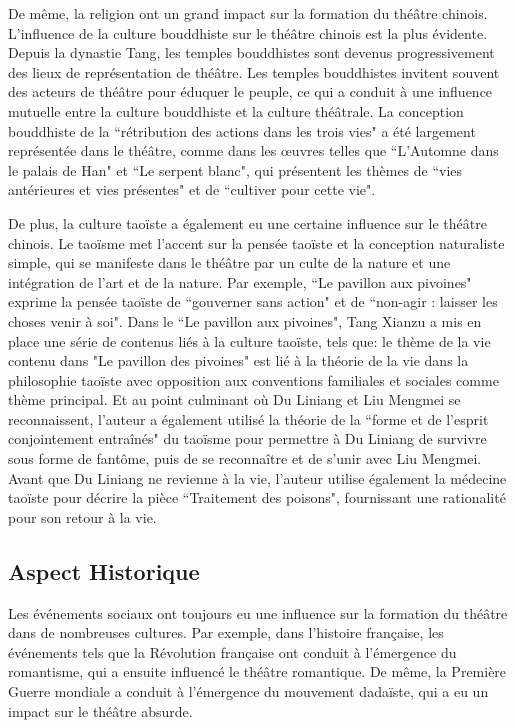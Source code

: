 \documentclass[UTF8,a4paper,12pt]{ctexart}
\numberwithin{equation}{section}
\newcommand{\mycite}[1]{\cite{#1}}
\begin{document}
De même, la religion ont un grand impact sur la formation du théâtre chinois. L'influence de la culture bouddhiste sur le théâtre chinois est la plus évidente. Depuis la dynastie Tang, les temples bouddhistes sont devenus progressivement des lieux de représentation de théâtre. Les temples bouddhistes invitent souvent des acteurs de théâtre pour éduquer le peuple, ce qui a conduit à une influence mutuelle entre la culture bouddhiste et la culture théâtrale\mycite{00}. La conception bouddhiste de la ``rétribution des actions dans les trois vies" a été largement représentée dans le théâtre, comme dans les œuvres telles que ``L'Automne dans le palais de Han" et ``Le serpent blanc", qui présentent les thèmes de ``vies antérieures et vies présentes" et de ``cultiver pour cette vie".

De plus, la culture taoïste a également eu une certaine influence sur le théâtre chinois. Le taoïsme met l'accent sur la pensée taoïste et la conception naturaliste simple, qui se manifeste dans le théâtre par un culte de la nature et une intégration de l'art et de la nature\mycite{55}. Par exemple, ``Le pavillon aux pivoines" exprime la pensée taoïste de ``gouverner sans action" et de ``non-agir : laisser les choses venir à soi". Dans le ``Le pavillon aux pivoines", Tang Xianzu a mis en place une série de contenus liés à la culture taoïste, tels que: le thème de la vie contenu dans "Le pavillon des pivoines" est lié à la théorie de la vie dans la philosophie taoïste avec opposition aux conventions familiales et sociales comme thème principal. Et au point culminant où Du Liniang et Liu Mengmei se reconnaissent, l'auteur a également utilisé la théorie de la ``forme et de l'esprit conjointement entraînés" du taoïsme pour permettre à Du Liniang de survivre sous forme de fantôme, puis de se reconnaître et de s'unir avec Liu Mengmei. Avant que Du Liniang ne revienne à la vie, l'auteur utilise également la médecine taoïste pour décrire la pièce ``Traitement des poisons", fournissant une rationalité pour son retour à la vie.

\subsection{Aspect Historique}

Les événements sociaux ont toujours eu une influence sur la formation du théâtre dans de nombreuses cultures. Par exemple, dans l'histoire française, les événements tels que la Révolution française ont conduit à l'émergence du romantisme, qui a ensuite influencé le théâtre romantique. De même, la Première Guerre mondiale a conduit à l'émergence du mouvement dadaïste, qui a eu un impact sur le théâtre absurde.
\end{document}

